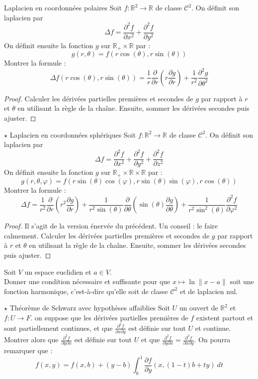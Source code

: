 \documentclass[french,a4paper]{article}
\newcommand{\R}{\mathbb{R}}
\theoremstyle{plain}
\theoremstyle{definition}
\theoremstyle{remark}
\begin{document}
\begin{ex}[Laf]{Laplacien en coordonnées polaires}
	Soit $f:\R^2\to\R$ de classe $\mathcal{C}^2$. On définit son laplacien par $$\Delta f=\frac{\partial^2 f}{\partial x^2}+\frac{\partial^2 f}{\partial y^2}$$ On définit ensuite la fonction $g$ sur $\R_+\times\R$ par : $$g(r,\theta)=f(r\cos(\theta),r\sin(\theta))$$ Montrer la formule : $$\Delta f(r\cos(\theta),r\sin(\theta))=\frac{1}{r}\frac{\partial}{\partial r}\left(r\frac{\partial g}{\partial r}\right)+\frac{1}{r^2}\frac{\partial^2 g}{\partial\theta^2}$$
\end{ex}
\begin{proof}
	Calculer les dérivées partielles premières et secondes de $g$ par rapport à $r$ et $\theta$ en utilisant la règle de la chaîne. Ensuite, sommer les dérivées secondes puis ajuster.
\end{proof}

\begin{ex}[Méchanceté]{$\star$ Laplacien en coordonnées sphériques}
	Soit $f:\R^2\to\R$ de classe $\mathcal{C}^2$. On définit son laplacien par $$\Delta f=\frac{\partial^2 f}{\partial x^2}+\frac{\partial^2 f}{\partial y^2}+\frac{\partial^2 f}{\partial z^2}$$ On définit ensuite la fonction $g$ sur $\R_+\times\R\times\R$ par : $$g(r,\theta,\varphi)=f(r\sin(\theta)\cos(\varphi),r\sin(\theta)\sin(\varphi),r\cos(\theta))$$ Montrer la formule : $$\Delta f=\frac{1}{r^2}\frac{\partial}{\partial r}\left(r^2\frac{\partial g}{\partial r}\right)+\frac{1}{r^2\sin(\theta)}\frac{\partial}{\partial\theta}\left(\sin(\theta)\frac{\partial g}{\partial\theta}\right)+\frac{1}{r^2\sin^2(\theta)}\frac{\partial^2 f}{\partial\varphi^2}$$
\end{ex}
\begin{proof}
	Il s'agit de la version énervée du précédent. Un conseil : le faire calmement. Calculer les dérivées partielles premières et secondes de $g$ par rapport à $r$ et $\theta$ en utilisant la règle de la chaîne. Ensuite, sommer les dérivées secondes puis ajuster.
\end{proof}

\begin{ex}[Moulin.28]{}
	Soit $V$ un espace euclidien et $a\in V$. \\ Donner une condition nécessaire et suffisante pour que $x\mapsto\ln\lVert x-a\rVert$ soit une fonction harmonique, c'est-à-dire qu'elle soit de classe $\mathcal{C}^2$ et de laplacien nul.
\end{ex}

\begin{ex}[Moulin.29]{$\star$ Théorème de Schwarz avec hypothèses affaiblies}
	Soit $U$ un ouvert de $\R^2$ et $f:U\to F$. on suppose que les dérivées partielles premières de $f$ existent partout et sont partiellement continues, et que $\displaystyle\frac{\partial^2 f}{\partial x\partial y}$ est définie sur tout $U$ et continue. Montrer alors que $\displaystyle\frac{\partial^2f}{\partial y\partial x}$ est définie sur tout $U$ et que $\displaystyle\frac{\partial^2f}{\partial y\partial x}=\frac{\partial^2 f}{\partial x\partial y}$. On pourra remarquer que : $$f(x,y)=f(x,b)+(y-b)\int_{0}^{1}\frac{\partial f}{\partial y}(x,(1-t)b+ty)\ dt$$
\end{ex}
\end{document}
